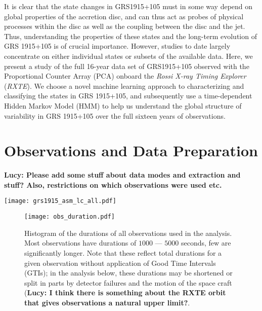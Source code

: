 \documentclass[12pt]{emulateapj}
\newcommand{\project}[1]{\textsl{#1}}
\newcommand{\rxte}{\project{RXTE}}
\begin{document}
It is clear that the state changes in GRS1915+105 must in some way depend on global properties of the accretion disc, and can thus act as probes of physical processes within the disc as well as the coupling between the disc and the jet. Thus, understanding the properties of these states and the long-term evolution of GRS 1915+105 is of crucial importance. However, studies to date largely concentrate on either individual states or subsets of the available data. 
Here, we present a study of the full 16-year data set of GRS1915+105 observed with the Proportional Counter Array (PCA) onboard the \textit{Rossi X-ray Timing Explorer} (\rxte). We choose a novel machine learning approach to characterizing and classifying the states in GRS 1915+105, and subsequently use a time-dependent Hidden Markov Model (HMM) to help us understand the global structure of variability in GRS 1915+105 over the full sixteen years of observations.

\section{Observations and Data Preparation}

{\bf Lucy: Please add some stuff about data modes and extraction and stuff? Also, restrictions on which observations were used etc.}

\begin{figure*}[htbp]
\begin{center}
\texttt{[image: grs1915\_asm\_lc\_all.pdf]}
\caption{\rxte\ All-Sky Monitor (ASM) light curve for the entire duration of the \rxte\ mission. Each panel covers $500$ days. Shown in blue is the ASM light curve. In green, the start points of the \rxte/PCA observations with high enough time resolution to be relevant for this analysis. The \rxte/PCA observations span the entire lifetime and provide a 
sample with high coverage in time, albeit with a bias toward active periods of the system.}
\label{fig:asm_total}
\end{center}
\end{figure*}

\begin{figure}[htbp]
\begin{center}
\texttt{[image: obs\_duration.pdf]}
\caption{Histogram of the durations of all observations used in the analysis. Most observations have durations of $1000$ --- $5000$ seconds, few are significantly longer. Note that these reflect total durations for a given observation without application of Good Time Intervals (GTIs); in the analysis below, these durations may be shortened or split in parts by detector failures and the motion of the space craft ({\bf Lucy: I think there is something about the RXTE orbit that gives observations a natural upper limit?}.}
\label{fig:obsdurations}
\end{center}
\end{figure}
\end{document}
